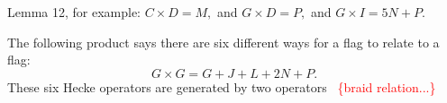 \documentclass[11pt,oneside]{article}
\newcommand{\todo}[1]{\ \textcolor{red}{\{#1\}}\ }
\newcommand{\thinplus}{\!+\!}
\begin{document}


Lemma 12,
for example: $C\times D=M,$ and $G\times D=P,$ and $G\times I = 5N+P$.

The following product says there are six different ways
for a flag to relate to a flag:
$$
    G\times G = G + J + L + 2N + P.
$$
These six Hecke operators are generated by two operators \todo{braid relation...}
\end{document}
